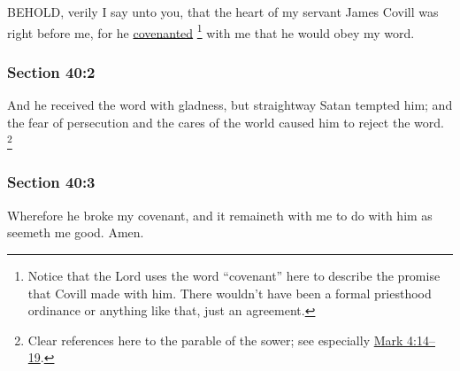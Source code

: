 		BEHOLD, verily I say unto you, that the heart of my servant James Covill was right before me, for he \hyperref[COVENANT]{covenanted}%
			\footnote{%
				Notice that the Lord uses the word ``covenant'' here to describe the promise that Covill made with him. There wouldn't have been a formal priesthood ordinance or anything like that, just an agreement.
				}
		with me that he would obey my word.


	\subsubsection{Section 40:2} %
		\label{DC40-2}

		And he received the word with gladness, but straightway Satan tempted him; and the fear of persecution and the cares of the world caused him to reject the word.%
			\footnote{%
				Clear references here to the parable of the sower; see especially \hyperref[MARK-4-14]{Mark 4:14--19}.
				}


	\subsubsection{Section 40:3} %
		\label{DC40-3}

		Wherefore he broke my covenant, and it remaineth with me to do with him as seemeth me good.  Amen.


